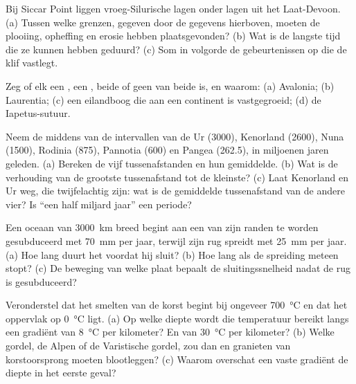 \begin{exercise}[$\star$]\label{exo:b2:wilson-cycle:3}
Bij Siccar Point liggen vroeg-Silurische lagen onder lagen uit het Laat-Devoon. (a) Tussen welke grenzen,
gegeven door de gegevens hierboven, moeten de plooiing, opheffing en erosie hebben plaatsgevonden? (b) Wat is
de langste tijd die ze kunnen hebben geduurd? (c) Som in volgorde de gebeurtenissen op die de klif vastlegt.
\end{exercise}

\begin{exercise}[$\star$]\label{exo:b2:wilson-cycle:4}
Zeg of elk een , een , beide of geen van beide is, en waarom: (a) Avalonia;
(b) Laurentia; (c) een eilandboog die aan een continent is vastgegroeid; (d) de Iapetus-sutuur.
\end{exercise}

\begin{exercise}[$\star\star$]\label{exo:b2:wilson-cycle:5}
Neem de middens van de intervallen van de  Ur (3000), Kenorland (2600),
Nuna (1500), Rodinia (875), Pannotia (600) en Pangea (262.5), in miljoenen jaren geleden.
(a) Bereken de vijf tussenafstanden en hun gemiddelde. (b) Wat is de verhouding van de grootste tussenafstand tot
de kleinste? (c) Laat Kenorland en Ur weg, die twijfelachtig zijn: wat is de gemiddelde tussenafstand van de
andere vier? Is ``een half miljard jaar'' een periode?
\end{exercise}

\begin{exercise}[$\star\star$]\label{exo:b2:wilson-cycle:6}
Een oceaan van \qty{3000}{km} breed begint aan een van zijn randen te worden gesubduceerd met \qty{70}{mm} per jaar,
terwijl zijn rug spreidt met \qty{25}{mm} per jaar. (a) Hoe lang duurt het voordat hij sluit?
(b) Hoe lang als de spreiding meteen stopt? (c) De beweging van welke plaat bepaalt de sluitingssnelheid nadat
de rug is gesubduceerd?
\end{exercise}

\begin{exercise}[$\star\star$]\label{exo:b2:wilson-cycle:7}
Veronderstel dat het smelten van de korst begint bij ongeveer \qty{700}{\celsius} en dat het oppervlak op
\qty{0}{\celsius} ligt. (a) Op welke diepte wordt die temperatuur bereikt langs een gradiënt van
\qty{8}{\celsius} per kilometer? En van \qty{30}{\celsius} per kilometer? (b) Welke gordel, de
Alpen of de Varistische gordel, zou dan  en granieten van korstoorsprong moeten blootleggen?
(c) Waarom overschat een vaste gradiënt de diepte in het eerste geval?
\end{exercise}

